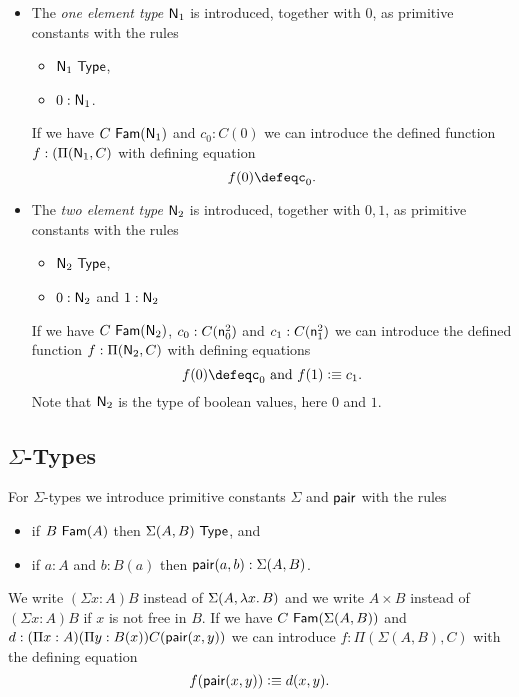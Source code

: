 {{\begin{itemize}
 If we have $C~\Fam(\NN_0)$ we can introduce $f:\Pi(\NN_0,C)$.  Note that in this case there is no defining equation.
In the special case where $C$ is $\lam{x} C_0$ where $C_0$ does not contain $x$ free, this represents the usual law of absurd elimination $\NN_0\rightarrow C_0$.

\medskip

\item The {\em one element type} ${\sf N}_1$ is introduced, together with $0$, as primitive constants with the rules
\begin{itemize}
\item ${\sf N}_1~{\sf Type}$,
\item $0:{\sf N}_1$.
\end{itemize}
If we have $C~{\sf Fam}({\sf N}_1)$ and $c_0:C(0)$ we can introduce the defined function 
$f:(\Pi({\sf N}_1,C)$ with defining equation
  \[ f(0)\defeqc_0.\]
\item The {\em two element type} ${\sf N}_2$ is introduced, together with $0,1$, as primitive constants with the rules
\begin{itemize}
\item ${\sf N}_2~{\sf Type}$,
\item $0:{\sf N}_2$ and $1:{\sf N}_2$
\end{itemize}
If we have $C~{\sf Fam}({\sf N}_2)$, $c_0:C({\sf n}^2_0)$ and $c_1:C({\sf n}^2_1)$ we can introduce the defined function 
$f:\Pi({\sf N}_2,C)$ with defining equations
  \[ f(0)\defeqc_0\mbox{ and }f(1)\defeq c_1.\]
Note that ${\sf N}_2$ is the type of boolean values, here $0$ and $1$.
\end{itemize}
}%

\subsection*{$\Sigma$-Types}
For $\Sigma$-types we introduce primitive constants $\Sigma$ and ${\sf pair}$ with the rules
\begin{itemize}
\item if $B~{\sf Fam}(A)$ then $\Sigma(A,B)~{\sf Type}$, and
\item if $a:A$ and $b:B(a)$ then ${\sf pair}(a,b):\Sigma(A,B)$.
\end{itemize}
We write $(\Sigma x:A)B$ instead
of $\Sigma(A,\lam{x} B)$ and we write $A\times B$ instead of $(\Sigma x:A)B$ if
$x$ is not free in $B$.  If we have $C~{\sf Fam}(\Sigma(A,B))$ and
$
d:(\Pi x:A)(\Pi y:B(x))C({\sf pair}(x,y))
$
we can introduce $f:\Pi(\Sigma(A,B),C)$ with the defining equation
$$
f({\sf pair}(x,y))\vcentcolon\equiv d(x,y).
$$

}
